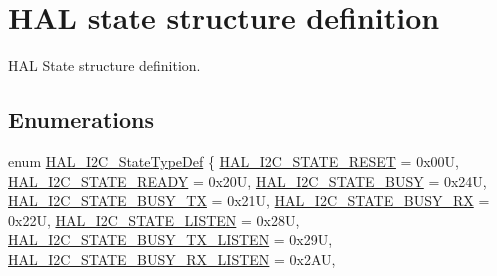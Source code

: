 \hypertarget{group___h_a_l__state__structure__definition}{}\section{H\+AL state structure definition}
\label{group___h_a_l__state__structure__definition}


H\+AL State structure definition.  


\subsection*{Enumerations}
\begin{DoxyCompactItemize}
\item 
enum \mbox{\hyperlink{group___h_a_l__state__structure__definition_gaef355af8eab251ae2a19ee164ad81c37}{H\+A\+L\+\_\+\+I2\+C\+\_\+\+State\+Type\+Def}} \{ \newline
\mbox{\hyperlink{group___h_a_l__state__structure__definition_ggaef355af8eab251ae2a19ee164ad81c37a91ba08634e08d7287940f1bc5a37eeff}{H\+A\+L\+\_\+\+I2\+C\+\_\+\+S\+T\+A\+T\+E\+\_\+\+R\+E\+S\+ET}} = 0x00U, 
\mbox{\hyperlink{group___h_a_l__state__structure__definition_ggaef355af8eab251ae2a19ee164ad81c37af859ce60c5e462b0bfde3a5010bc72d1}{H\+A\+L\+\_\+\+I2\+C\+\_\+\+S\+T\+A\+T\+E\+\_\+\+R\+E\+A\+DY}} = 0x20U, 
\mbox{\hyperlink{group___h_a_l__state__structure__definition_ggaef355af8eab251ae2a19ee164ad81c37a0c503d6c0388f0d872b368557e278b5a}{H\+A\+L\+\_\+\+I2\+C\+\_\+\+S\+T\+A\+T\+E\+\_\+\+B\+U\+SY}} = 0x24U, 
\mbox{\hyperlink{group___h_a_l__state__structure__definition_ggaef355af8eab251ae2a19ee164ad81c37acb3a9e3d4d1076e0f4e65f91ca0161bc}{H\+A\+L\+\_\+\+I2\+C\+\_\+\+S\+T\+A\+T\+E\+\_\+\+B\+U\+S\+Y\+\_\+\+TX}} = 0x21U, 
\newline
\mbox{\hyperlink{group___h_a_l__state__structure__definition_ggaef355af8eab251ae2a19ee164ad81c37a4ea4ecc2dc3cb64c4877c123d9d73170}{H\+A\+L\+\_\+\+I2\+C\+\_\+\+S\+T\+A\+T\+E\+\_\+\+B\+U\+S\+Y\+\_\+\+RX}} = 0x22U, 
\mbox{\hyperlink{group___h_a_l__state__structure__definition_ggaef355af8eab251ae2a19ee164ad81c37a13518f06f54c7515100e86bb8d6e0779}{H\+A\+L\+\_\+\+I2\+C\+\_\+\+S\+T\+A\+T\+E\+\_\+\+L\+I\+S\+T\+EN}} = 0x28U, 
\mbox{\hyperlink{group___h_a_l__state__structure__definition_ggaef355af8eab251ae2a19ee164ad81c37a14d22553a60819b276582e08459f30b0}{H\+A\+L\+\_\+\+I2\+C\+\_\+\+S\+T\+A\+T\+E\+\_\+\+B\+U\+S\+Y\+\_\+\+T\+X\+\_\+\+L\+I\+S\+T\+EN}} = 0x29U, 
\mbox{\hyperlink{group___h_a_l__state__structure__definition_ggaef355af8eab251ae2a19ee164ad81c37a8aec2547eedf1c9924f8efed33e3b5c5}{H\+A\+L\+\_\+\+I2\+C\+\_\+\+S\+T\+A\+T\+E\+\_\+\+B\+U\+S\+Y\+\_\+\+R\+X\+\_\+\+L\+I\+S\+T\+EN}} = 0x2\+AU, 

\end{DoxyCompactItemize}
